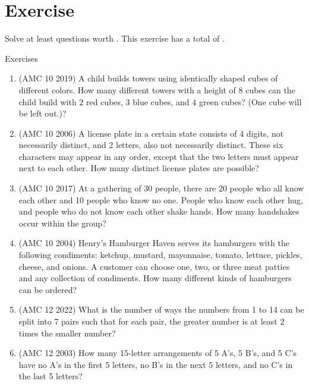 \section{Exercise}
Solve at least questions worth . This exercise has a total of .
\begin{xcb}{Exercises}
\begin{enumerate}
\item(AMC 10 2019)  A child builds towers using identically shaped cubes of different colors. 
How many different towers with a height of $8$ cubes can the child build with $2$ red cubes, $3$ blue cubes, 
and $4$ green cubes? (One cube will be left out.)?
\begin{hint}
\end{hint}
\item (AMC 10 2006)  A license plate in a certain state consists of 4 digits, not necessarily distinct, and 2 letters, also not necessarily distinct. These six characters may appear in any order, except that the two letters must appear next to each other. How many distinct license plates are possible?
\begin{hint}
\end{hint}
\item (AMC 10 2017)  At a gathering of 30 people, there are 20 people who all know each other and 10 people who know no one. People who know each other hug, and people who do not know each other shake hands. How many handshakes occur within the group?
\item (AMC 10 2004)  Henry’s Hamburger Haven serves its hamburgers with the following condiments: ketchup, mustard, mayonnaise, tomato, lettuce, pickles, cheese, and onions. A customer can choose one, two, or three meat patties and any collection of condiments. How many different kinds of hamburgers can be ordered?
\item (AMC 12 2022)  What is the number of ways the numbers from 1 to 14 can be split into 7 pairs such that for each pair, the greater number is at least 2 times the smaller number?
\begin{hint}
\end{hint}
\item(AMC 12 2003)  How many 15-letter arrangements of 5 A’s, 5 B’s, and 5 C’s have no A’s in the first 5 letters, no B’s in the next 5 letters, and no C’s in the last 5 letters?

\end{enumerate}
\end{xcb}
